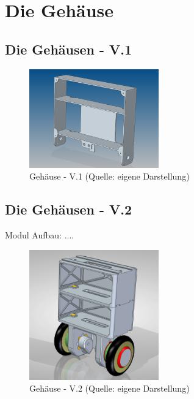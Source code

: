 \newpage
\renewcommand{\autoren}{Valentyn Chepil, Alexsander Stoiljkovic}
\newpage
\section{Die Gehäuse}
\subsection{Die Gehäusen - V.1}

\begin{figure}[!h]  %
	\centering\includegraphics[width=0.5\textwidth]{images/gehaeuse-v1.png}
	\caption{Gehäuse - V.1 \newline (Quelle: eigene Darstellung)}
	\label{gehaeuse-v1} %
\end{figure}

\subsection{Die Gehäusen - V.2}
Modul Aufbau: ....

\begin{figure}[!h]  %
	\centering\includegraphics[width=0.5\textwidth]{images/gehaeuse-v2.png}
	\caption{Gehäuse - V.2 \newline (Quelle: eigene Darstellung)}
	\label{gehaeuse-v2} %
\end{figure}



